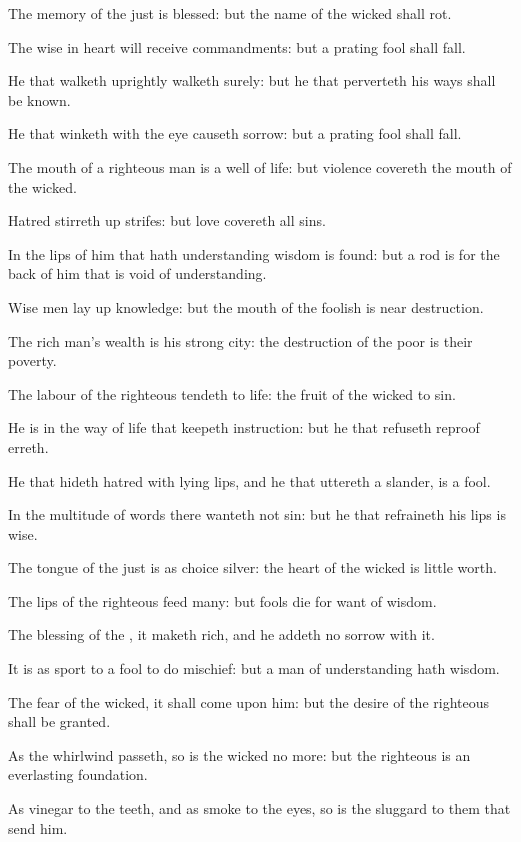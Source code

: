 \verse The memory of the just is blessed: but the name of the wicked shall rot.

\verse The wise in heart will receive commandments: but a prating fool shall fall.

\verse He that walketh uprightly walketh surely: but he that perverteth his ways shall be known.

\verse He that winketh with the eye causeth sorrow: but a prating fool shall fall.

\verse The mouth of a righteous man is a well of life: but violence covereth the mouth of the wicked.

\verse Hatred stirreth up strifes: but love covereth all sins.

\verse In the lips of him that hath understanding wisdom is found: but a rod is for the back of him that is void of understanding.

\verse Wise men lay up knowledge: but the mouth of the foolish is near destruction.

\verse The rich man's wealth is his strong city: the destruction of the poor is their poverty.

\verse The labour of the righteous tendeth to life: the fruit of the wicked to sin.

\verse He is in the way of life that keepeth instruction: but he that refuseth reproof erreth.

\verse He that hideth hatred with lying lips, and he that uttereth a slander, is a fool.

\verse In the multitude of words there wanteth not sin: but he that refraineth his lips is wise.

\verse The tongue of the just is as choice silver: the heart of the wicked is little worth.

\verse The lips of the righteous feed many: but fools die for want of wisdom.

\verse The blessing of the \LORD, it maketh rich, and he addeth no sorrow with it.

\verse It is as sport to a fool to do mischief: but a man of understanding hath wisdom.

\verse The fear of the wicked, it shall come upon him: but the desire of the righteous shall be granted.

\verse As the whirlwind passeth, so is the wicked no more: but the righteous is an everlasting foundation.

\verse As vinegar to the teeth, and as smoke to the eyes, so is the sluggard to them that send him.

